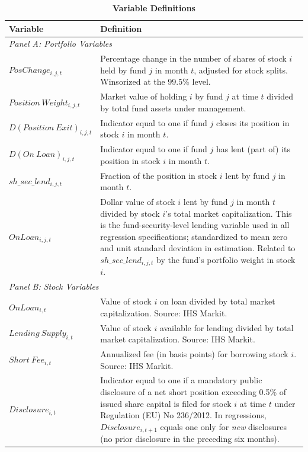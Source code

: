 
\begin{table}[p]
\caption{\textbf{Variable Definitions}}
\label{table_variable_definitions}
\begin{center}
{\footnotesize
\begin{tabular}{p{4.5cm}p{10cm}}
\toprule
\textbf{Variable} & \textbf{Definition} \\
\midrule
\multicolumn{2}{l}{\textit{Panel A: Portfolio Variables}} \\
\midrule
$PosChange_{i,j,t}$ & Percentage change in the number of shares of stock $i$ held by fund $j$ in month $t$, adjusted for stock splits. Winsorized at the 99.5\% level. \\[0.3em]
$Position\ Weight_{i,j,t}$ & Market value of holding $i$ by fund $j$ at time $t$ divided by total fund assets under management. \\[0.3em]
$D(Position\ Exit)_{i,j,t}$ & Indicator equal to one if fund $j$ closes its position in stock $i$ in month $t$. \\[0.3em]
$D(On\ Loan)_{i,j,t}$ & Indicator equal to one if fund $j$ has lent (part of) its position in stock $i$ in month $t$. \\[0.3em]
$sh\_sec\_lend_{i,j,t}$ & Fraction of the position in stock $i$ lent by fund $j$ in month $t$. \\[0.3em]
$OnLoan_{i,j,t}$ & Dollar value of stock $i$ lent by fund $j$ in month $t$ divided by stock $i$'s total market capitalization. This is the fund-security-level lending variable used in all regression specifications; standardized to mean zero and unit standard deviation in estimation. Related to $sh\_sec\_lend_{i,j,t}$ by the fund's portfolio weight in stock $i$. \\[0.3em]
\midrule
\multicolumn{2}{l}{\textit{Panel B: Stock Variables}} \\
\midrule
$OnLoan_{i,t}$ & Value of stock $i$ on loan divided by total market capitalization. Source: IHS Markit. \\[0.3em]
$Lending\ Supply_{i,t}$ & Value of stock $i$ available for lending divided by total market capitalization. Source: IHS Markit. \\[0.3em]
$Short\ Fee_{i,t}$ & Annualized fee (in basis points) for borrowing stock $i$. Source: IHS Markit. \\[0.3em]
$Disclosure_{i,t}$ & Indicator equal to one if a mandatory public disclosure of a net short position exceeding 0.5\% of issued share capital is filed for stock $i$ at time $t$ under Regulation (EU) No 236/2012. In regressions, $Disclosure_{i,t+1}$ equals one only for \textit{new} disclosures (no prior disclosure in the preceding six months). \\[0.3em]

\end{tabular}}
\end{center}
\end{table}
